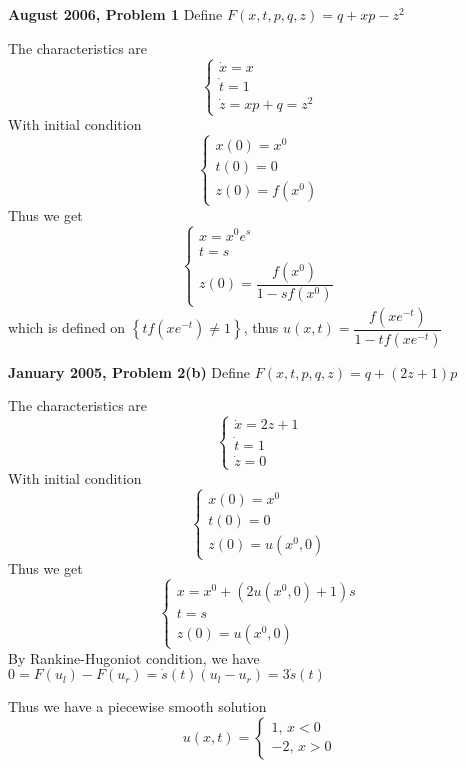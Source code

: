 \documentclass[../main.tex]{subfiles}
\begin{document}
\begin{customproblem}\textbf{August 2006, Problem 1} 
Define $F(x,t,p,q,z)=q+xp-z^2$ \par
The characteristics are
\[
\left\{
\begin{array}{ll}
\dot{x}=x \\
\dot{t}=1 \\
\dot{z}=xp+q=z^2
\end{array}
\right.
\]
With initial condition
\[
\left\{
\begin{array}{ll}
x(0)=x^0 \\
t(0)=0 \\
z(0)=f(x^0)
\end{array}
\right.
\]
Thus we get
\[
\left\{
\begin{array}{ll}
x = x^0e^s \\
t=s \\
z(0)=\dfrac{f(x^0)}{1-sf(x^0)}
\end{array}
\right.
\]
which is defined on $\left\{tf(xe^{-t})\neq 1\right\}$, thus $u(x,t)=\dfrac{f(xe^{-t})}{1-tf(xe^{-t})}$
\end{customproblem}

\begin{customproblem}\textbf{January 2005, Problem 2(b)}
Define $F(x,t,p,q,z)=q+(2z+1)p$ \par
The characteristics are
\[
\left\{
\begin{array}{ll}
\dot{x}=2z+1 \\
\dot{t}=1 \\
\dot{z}=0
\end{array}
\right.
\]
With initial condition
\[
\left\{
\begin{array}{ll}
x(0)=x^0 \\
t(0)=0 \\
z(0)=u(x^0,0)
\end{array}
\right.
\]
Thus we get
\[
\left\{
\begin{array}{ll}
x = x^0+\left(2u(x^0,0)+1\right)s \\
t=s \\
z(0)=u(x^0,0)
\end{array}
\right.
\]
By Rankine-Hugoniot condition, we have $0=F(u_l)-F(u_r)=\dot{s}(t)(u_l-u_r)=3\dot{s}(t)$ \par
Thus we have a piecewise smooth solution
\[
u(x,t)=
\left\{
\begin{array}{ll}
1,\,x<0 \\
-2,\,x>0
\end{array}
\right.
\]
\end{customproblem}
\end{document}
